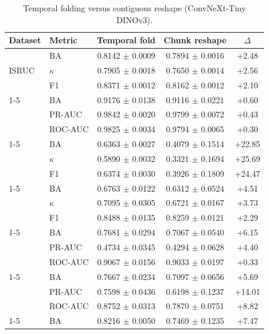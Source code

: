 \begin{table}[tbp]\centering\scriptsize\caption{Temporal folding versus contiguous reshape (ConvNeXt-Tiny DINOv3).}\begin{tabular}{@{}l l c c c@{}}\toprule Dataset & Metric & Temporal fold & Chunk reshape & $\Delta$ \\ \midrule
\multirow{3}{*}{ISRUC} & BA & 0.8142 $\pm$ 0.0009 & 0.7894 $\pm$ 0.0016 & +2.48 \\
 & $\kappa$ & 0.7905 $\pm$ 0.0018 & 0.7650 $\pm$ 0.0014 & +2.56 \\
 & F1 & 0.8371 $\pm$ 0.0012 & 0.8162 $\pm$ 0.0012 & +2.10 \\
\cmidrule(lr){1-5}
\multirow{3}{*}{Mumtaz2016} & BA & 0.9176 $\pm$ 0.0138 & 0.9116 $\pm$ 0.0221 & +0.60 \\
 & PR-AUC & 0.9842 $\pm$ 0.0020 & 0.9799 $\pm$ 0.0072 & +0.43 \\
 & ROC-AUC & 0.9825 $\pm$ 0.0034 & 0.9794 $\pm$ 0.0065 & +0.30 \\
\cmidrule(lr){1-5}
\multirow{3}{*}{FACED} & BA & 0.6363 $\pm$ 0.0027 & 0.4079 $\pm$ 0.1514 & +22.85 \\
 & $\kappa$ & 0.5890 $\pm$ 0.0032 & 0.3321 $\pm$ 0.1694 & +25.69 \\
 & F1 & 0.6374 $\pm$ 0.0030 & 0.3926 $\pm$ 0.1809 & +24.47 \\
\cmidrule(lr){1-5}
\multirow{3}{*}{TUEV} & BA & 0.6763 $\pm$ 0.0122 & 0.6312 $\pm$ 0.0524 & +4.51 \\
 & $\kappa$ & 0.7095 $\pm$ 0.0305 & 0.6721 $\pm$ 0.0167 & +3.73 \\
 & F1 & 0.8488 $\pm$ 0.0135 & 0.8259 $\pm$ 0.0121 & +2.29 \\
\cmidrule(lr){1-5}
\multirow{3}{*}{CHB-MIT} & BA & 0.7681 $\pm$ 0.0294 & 0.7067 $\pm$ 0.0540 & +6.15 \\
 & PR-AUC & 0.4734 $\pm$ 0.0345 & 0.4294 $\pm$ 0.0628 & +4.40 \\
 & ROC-AUC & 0.9067 $\pm$ 0.0156 & 0.9033 $\pm$ 0.0197 & +0.33 \\
\cmidrule(lr){1-5}
\multirow{3}{*}{MentalArithmetic} & BA & 0.7667 $\pm$ 0.0234 & 0.7097 $\pm$ 0.0656 & +5.69 \\
 & PR-AUC & 0.7598 $\pm$ 0.0436 & 0.6198 $\pm$ 0.1237 & +14.01 \\
 & ROC-AUC & 0.8752 $\pm$ 0.0313 & 0.7870 $\pm$ 0.0751 & +8.82 \\
\cmidrule(lr){1-5}
\multirow{3}{*}{TUAB} & BA & 0.8216 $\pm$ 0.0050 & 0.7469 $\pm$ 0.1235 & +7.47 \\

\end{tabular}
\end{table}
